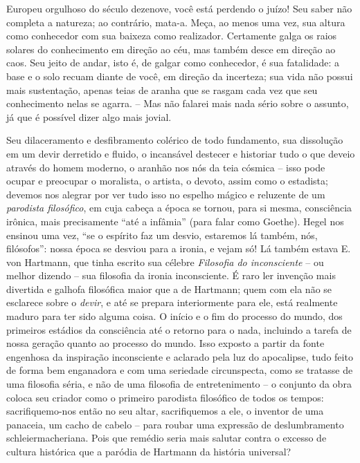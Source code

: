     Europeu orgulhoso do século dezenove, você está perdendo o juízo!
    Seu saber não completa a natureza; ao contrário, mata-a. Meça, ao
    menos uma vez, sua altura como conhecedor com sua baixeza como
    realizador. Certamente galga os raios solares do conhecimento em
    direção ao céu, mas também desce em direção ao caos. Seu jeito de
    andar, isto é, de galgar como conhecedor, é sua fatalidade: a base e
    o solo recuam diante de você, em direção da incerteza; sua vida não
    possui mais sustentação, apenas teias de aranha que se rasgam cada
    vez que seu conhecimento nelas se agarra. -- Mas não falarei mais
    nada sério sobre o assunto, já que é possível dizer algo mais
    jovial.

    Seu dilaceramento e desfibramento colérico de todo fundamento, sua
    dissolução em um devir derretido e fluido, o incansável destecer e
    historiar tudo o que deveio através do homem moderno, o aranhão nos
    nós da teia cósmica -- isso pode ocupar e preocupar o moralista, o
    artista, o devoto, assim como o estadista; devemos nos alegrar por
    ver tudo isso no espelho mágico e reluzente de um \emph{parodista
    filosófico}, em cuja cabeça a época se tornou, para si mesma,
    consciência irônica, mais precisamente ``até a infâmia'' (para falar
    como Goethe). Hegel nos ensinou uma vez, ``se o espírito faz um
    desvio, estaremos lá também, nós, filósofos'': nossa época se
    desviou para a ironia, e vejam só! Lá também estava E. von Hartmann,
    que tinha escrito sua célebre \emph{Filosofia do inconsciente} -- ou
    melhor dizendo -- sua filosofia da ironia inconsciente. É raro ler
    invenção mais divertida e galhofa filosófica maior que a de
    Hartmann; quem com ela não se esclarece sobre o \emph{devir}, e até
    se prepara interiormente para ele, está realmente maduro para ter
    sido alguma coisa. O início e o fim do processo do mundo, dos
    primeiros estádios da consciência até o retorno para o nada,
    incluindo a tarefa de nossa geração quanto ao processo do mundo.
    Isso exposto a partir da fonte engenhosa da inspiração inconsciente
    e aclarado pela luz do apocalipse, tudo feito de forma bem
    enganadora e com uma seriedade circunspecta, como se tratasse de uma
    filosofia séria, e não de uma filosofia de entretenimento -- o
    conjunto da obra coloca seu criador como o primeiro parodista
    filosófico de todos os tempos: sacrifiquemo-nos então no seu altar,
    sacrifiquemos a ele, o inventor de uma panaceia, um cacho de cabelo
    -- para roubar uma expressão de deslumbramento schleiermacheriana.
    Pois que remédio seria mais salutar contra o excesso de cultura
    histórica que a paródia de Hartmann da história universal?


